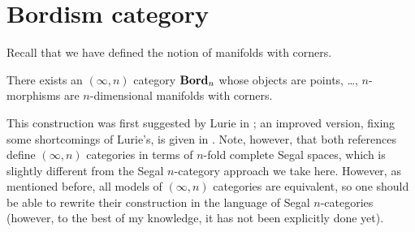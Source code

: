 \section{Bordism category}\label{s:bordn-highercat}
Recall that we have defined the notion of manifolds with corners.

\begin{theorem}\label{t:bordn-highercat}
  There exists an $(\infty, n)$ category $\mathbf{Bord}_n$ whose objects are points,
  \dots, $n$-morphisms are $n$-dimensional manifolds with corners.
\end{theorem}
This construction was first suggested by Lurie in \cite{lurie-cobordism}; an
improved version, fixing some shortcomings of Lurie's, is given in
\cite{calaque}. Note, however, that both references define $(\infty, n)$
categories in terms of $n$-fold complete Segal spaces, which is slightly
different from the Segal $n$-category approach we take here. However, as
mentioned before, all models of $(\infty, n)$ categories are equivalent, so one
should be able to rewrite their construction in the language of Segal
$n$-categories (however, to the best of my knowledge, it has not been explicitly
done yet).


\clearpage
